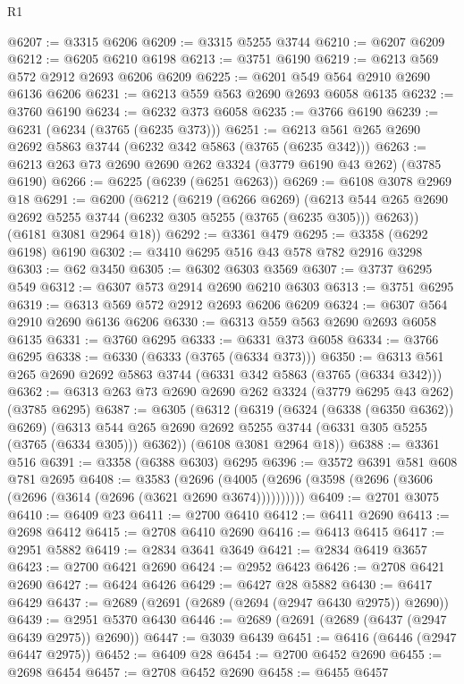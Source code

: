 \begin{lexlean}{R1}
\begin{coremodule}
@6207 := @3315 @6206
@6209 := @3315 @5255 @3744
@6210 := @6207 @6209
@6212 := @6205 @6210 @6198
@6213 := @3751 @6190
@6219 := @6213 @569 @572 @2912 @2693 @6206 @6209
@6225 := @6201 @549 @564 @2910 @2690 @6136 @6206
@6231 := @6213 @559 @563 @2690 @2693 @6058 @6135
@6232 := @3760 @6190
@6234 := @6232 @373 @6058
@6235 := @3766 @6190
@6239 := @6231 (@6234 (@3765 (@6235 @373)))
@6251 := @6213 @561 @265 @2690 @2692 @5863 @3744 (@6232 @342 @5863 (@3765 (@6235 @342)))
@6263 := @6213 @263 @73 @2690 @2690 @262 @3324 (@3779 @6190 @43 @262) (@3785 @6190)
@6266 := @6225 (@6239 (@6251 @6263))
@6269 := @6108 @3078 @2969 @18
@6291 := @6200
    (@6212
      (@6219
        (@6266 @6269)
        (@6213 @544 @265 @2690 @2692 @5255 @3744 (@6232 @305 @5255 (@3765 (@6235 @305))) @6263))
      (@6181 @3081 @2964 @18))
@6292 := @3361 @479
@6295 := @3358 (@6292 @6198) @6190
@6302 := @3410 @6295 @516 @43 @578 @782 @2916 @3298
@6303 := @62 @3450
@6305 := @6302 @6303 @3569
@6307 := @3737 @6295 @549
@6312 := @6307 @573 @2914 @2690 @6210 @6303
@6313 := @3751 @6295
@6319 := @6313 @569 @572 @2912 @2693 @6206 @6209
@6324 := @6307 @564 @2910 @2690 @6136 @6206
@6330 := @6313 @559 @563 @2690 @2693 @6058 @6135
@6331 := @3760 @6295
@6333 := @6331 @373 @6058
@6334 := @3766 @6295
@6338 := @6330 (@6333 (@3765 (@6334 @373)))
@6350 := @6313 @561 @265 @2690 @2692 @5863 @3744 (@6331 @342 @5863 (@3765 (@6334 @342)))
@6362 := @6313 @263 @73 @2690 @2690 @262 @3324 (@3779 @6295 @43 @262) (@3785 @6295)
@6387 := @6305
    (@6312
      (@6319
        (@6324 (@6338 (@6350 @6362)) @6269)
        (@6313 @544 @265 @2690 @2692 @5255 @3744 (@6331 @305 @5255 (@3765 (@6334 @305))) @6362))
      (@6108 @3081 @2964 @18))
@6388 := @3361 @516
@6391 := @3358 (@6388 @6303) @6295
@6396 := @3572 @6391 @581 @608 @781 @2695
@6408 := @3583
    (@2696 (@4005 (@2696 (@3598 (@2696 (@3606 (@2696 (@3614 (@2696 (@3621 @2690 @3674))))))))))
@6409 := @2701 @3075
@6410 := @6409 @23
@6411 := @2700 @6410
@6412 := @6411 @2690
@6413 := @2698 @6412
@6415 := @2708 @6410 @2690
@6416 := @6413 @6415
@6417 := @2951 @5882
@6419 := @2834 @3641 @3649
@6421 := @2834 @6419 @3657
@6423 := @2700 @6421 @2690
@6424 := @2952 @6423
@6426 := @2708 @6421 @2690
@6427 := @6424 @6426
@6429 := @6427 @28 @5882
@6430 := @6417 @6429
@6437 := @2689 (@2691 (@2689 (@2694 (@2947 @6430 @2975)) @2690))
@6439 := @2951 @5370 @6430
@6446 := @2689 (@2691 (@2689 (@6437 (@2947 @6439 @2975)) @2690))
@6447 := @3039 @6439
@6451 := @6416 (@6446 (@2947 @6447 @2975))
@6452 := @6409 @28
@6454 := @2700 @6452 @2690
@6455 := @2698 @6454
@6457 := @2708 @6452 @2690
@6458 := @6455 @6457

\end{coremodule}
\end{lexlean}

